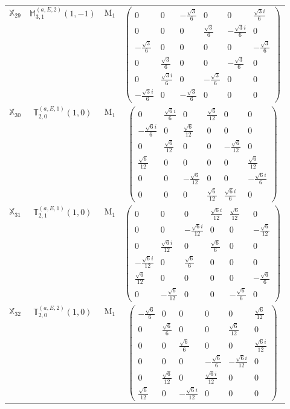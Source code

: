 \documentclass[fleqn,10pt,landscape]{article}
\begin{document}
\begin{itemize}
\begin{center}
\begin{longtable}{c|c|c|c}
$ \mathbb{X}_{29} $ & $\mathbb{M}_{3,1}^{(a,E,2)}(1,-1)$ & M$_{1}$ & $\begin{pmatrix} 0 & 0 & - \frac{\sqrt{3}}{6} & 0 & 0 & \frac{\sqrt{3} i}{6} \\ 0 & 0 & 0 & \frac{\sqrt{3}}{6} & - \frac{\sqrt{3} i}{6} & 0 \\ - \frac{\sqrt{3}}{6} & 0 & 0 & 0 & 0 & - \frac{\sqrt{3}}{6} \\ 0 & \frac{\sqrt{3}}{6} & 0 & 0 & - \frac{\sqrt{3}}{6} & 0 \\ 0 & \frac{\sqrt{3} i}{6} & 0 & - \frac{\sqrt{3}}{6} & 0 & 0 \\ - \frac{\sqrt{3} i}{6} & 0 & - \frac{\sqrt{3}}{6} & 0 & 0 & 0 \end{pmatrix}$ \\
$ \mathbb{X}_{30} $ & $\mathbb{T}_{2,0}^{(a,E,1)}(1,0)$ & M$_{1}$ & $\begin{pmatrix} 0 & \frac{\sqrt{6} i}{6} & 0 & \frac{\sqrt{6}}{12} & 0 & 0 \\ - \frac{\sqrt{6} i}{6} & 0 & \frac{\sqrt{6}}{12} & 0 & 0 & 0 \\ 0 & \frac{\sqrt{6}}{12} & 0 & 0 & - \frac{\sqrt{6}}{12} & 0 \\ \frac{\sqrt{6}}{12} & 0 & 0 & 0 & 0 & \frac{\sqrt{6}}{12} \\ 0 & 0 & - \frac{\sqrt{6}}{12} & 0 & 0 & - \frac{\sqrt{6} i}{6} \\ 0 & 0 & 0 & \frac{\sqrt{6}}{12} & \frac{\sqrt{6} i}{6} & 0 \end{pmatrix}$ \\
$ \mathbb{X}_{31} $ & $\mathbb{T}_{2,1}^{(a,E,1)}(1,0)$ & M$_{1}$ & $\begin{pmatrix} 0 & 0 & 0 & \frac{\sqrt{6} i}{12} & \frac{\sqrt{6}}{12} & 0 \\ 0 & 0 & - \frac{\sqrt{6} i}{12} & 0 & 0 & - \frac{\sqrt{6}}{12} \\ 0 & \frac{\sqrt{6} i}{12} & 0 & \frac{\sqrt{6}}{6} & 0 & 0 \\ - \frac{\sqrt{6} i}{12} & 0 & \frac{\sqrt{6}}{6} & 0 & 0 & 0 \\ \frac{\sqrt{6}}{12} & 0 & 0 & 0 & 0 & - \frac{\sqrt{6}}{6} \\ 0 & - \frac{\sqrt{6}}{12} & 0 & 0 & - \frac{\sqrt{6}}{6} & 0 \end{pmatrix}$ \\
$ \mathbb{X}_{32} $ & $\mathbb{T}_{2,0}^{(a,E,2)}(1,0)$ & M$_{1}$ & $\begin{pmatrix} - \frac{\sqrt{6}}{6} & 0 & 0 & 0 & 0 & \frac{\sqrt{6}}{12} \\ 0 & \frac{\sqrt{6}}{6} & 0 & 0 & \frac{\sqrt{6}}{12} & 0 \\ 0 & 0 & \frac{\sqrt{6}}{6} & 0 & 0 & \frac{\sqrt{6} i}{12} \\ 0 & 0 & 0 & - \frac{\sqrt{6}}{6} & - \frac{\sqrt{6} i}{12} & 0 \\ 0 & \frac{\sqrt{6}}{12} & 0 & \frac{\sqrt{6} i}{12} & 0 & 0 \\ \frac{\sqrt{6}}{12} & 0 & - \frac{\sqrt{6} i}{12} & 0 & 0 & 0 \end{pmatrix}$ \\

\end{longtable}
\end{center}
\end{itemize}
\end{document}
